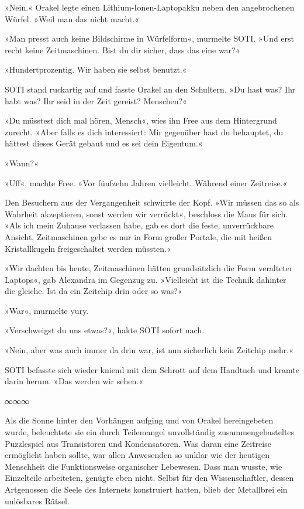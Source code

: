 »Nein.« Orakel legte einen Lithium-Ionen-Laptopakku neben den angebrochenen Würfel. »Weil man das nicht macht.«

»Man presst auch keine Bildschirme in Würfelform«, murmelte SOTI. »Und erst recht keine Zeitmaschinen. Bist du dir sicher, dass das eine war?«

»Hundertprozentig. Wir haben sie selbst benutzt.«

SOTI stand ruckartig auf und fasste Orakel an den Schultern. »Du hast was? Ihr habt was? Ihr seid in der Zeit gereist? Menschen?«

»Du müsstest dich mal hören, Mensch«, wies ihn Free aus dem Hintergrund zurecht. »Aber falls es dich interessiert: Mir gegenüber hast du behauptet, du hättest dieses Gerät gebaut und es sei dein Eigentum.«

»Wann?«

»Uff«, machte Free. »Vor fünfzehn Jahren vielleicht. Während einer Zeitreise.«

Den Besuchern aus der Vergangenheit schwirrte der Kopf. »Wir müssen das so als Wahrheit akzeptieren, sonst werden wir verrückt«, beschloss die Maus für sich. »Als ich mein Zuhause verlassen habe, gab es dort die feste, unverrückbare Ansicht, Zeitmaschinen gebe es nur in Form großer Portale, die mit heißen Kristallkugeln freigeschaltet werden müssten.«

»Wir dachten bis heute, Zeitmaschinen hätten grundsätzlich die Form veralteter Laptops«, gab Alexandra im Gegenzug zu. »Vielleicht ist die Technik dahinter die gleiche. Ist da ein Zeitchip drin oder so was?«

»War«, murmelte yury.

»Verschweigst du uns etwas?«, hakte SOTI sofort nach.

»Nein, aber was auch immer da drin war, ist nun sicherlich kein Zeitchip mehr.«

SOTI befasste sich wieder kniend mit dem Schrott auf dem Handtuch und kramte darin herum. »Das werden wir sehen.«

\begin{center}
∞∞∞
\end{center}

Als die Sonne hinter den Vorhängen aufging und von Orakel hereingebeten wurde, beleuchtete sie ein durch Teilemangel unvollständig zusammengebasteltes Puzzlespiel aus Transistoren und Kondensatoren. Was daran eine Zeitreise ermöglicht haben sollte, war allen Anwesenden so unklar wie der heutigen Menschheit die Funktionsweise organischer Lebewesen. Dass man wusste, wie Einzelteile arbeiteten, genügte eben nicht. Selbst für den Wissenschaftler, dessen Artgenossen die Seele des Internets konstruiert hatten, blieb der Metallbrei ein unlösbares Rätsel.

